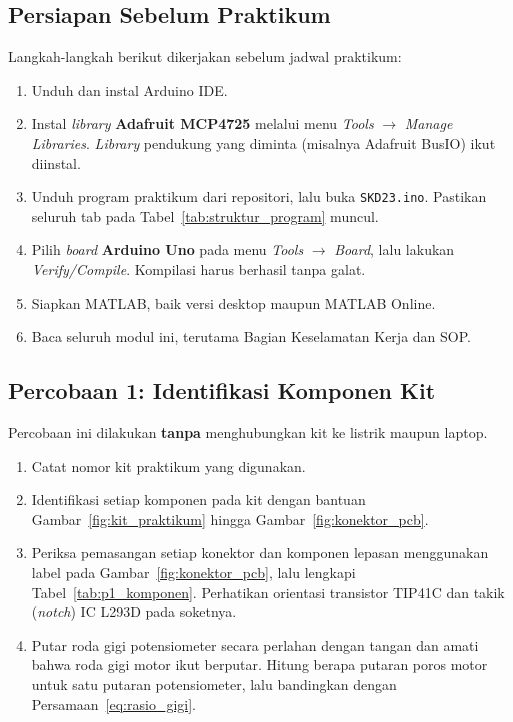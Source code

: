 \documentclass[11pt,a4paper]{article}
\newcommand{\sketch}{\texttt{SKD23.ino}}
\begin{document}
\subsection{Persiapan Sebelum Praktikum}
Langkah-langkah berikut dikerjakan sebelum jadwal praktikum:
\begin{enumerate}
	\item Unduh dan instal Arduino IDE.
	\item Instal \textit{library} \textbf{Adafruit MCP4725} melalui menu \textit{Tools} $\rightarrow$ \textit{Manage Libraries}. \textit{Library} pendukung yang diminta (misalnya Adafruit BusIO) ikut diinstal.
	\item Unduh program praktikum dari repositori, lalu buka \sketch. Pastikan seluruh tab pada Tabel~\ref{tab:struktur_program} muncul.
	\item Pilih \textit{board} \textbf{Arduino Uno} pada menu \textit{Tools} $\rightarrow$ \textit{Board}, lalu lakukan \textit{Verify/Compile}. Kompilasi harus berhasil tanpa galat.
	\item Siapkan MATLAB, baik versi desktop maupun MATLAB Online.
	\item Baca seluruh modul ini, terutama Bagian Keselamatan Kerja dan SOP.
\end{enumerate}

\subsection{Percobaan 1: Identifikasi Komponen Kit}
Percobaan ini dilakukan \textbf{tanpa} menghubungkan kit ke listrik maupun laptop.
\begin{enumerate}
	\item Catat nomor kit praktikum yang digunakan.
	\item Identifikasi setiap komponen pada kit dengan bantuan Gambar~\ref{fig:kit_praktikum} hingga Gambar~\ref{fig:konektor_pcb}.
	\item Periksa pemasangan setiap konektor dan komponen lepasan menggunakan label pada Gambar~\ref{fig:konektor_pcb}, lalu lengkapi Tabel~\ref{tab:p1_komponen}. Perhatikan orientasi transistor TIP41C dan takik (\textit{notch}) IC L293D pada soketnya.
	\item Putar roda gigi potensiometer secara perlahan dengan tangan dan amati bahwa roda gigi motor ikut berputar. Hitung berapa putaran poros motor untuk satu putaran potensiometer, lalu bandingkan dengan Persamaan~\eqref{eq:rasio_gigi}.
\end{enumerate}
\end{document}
